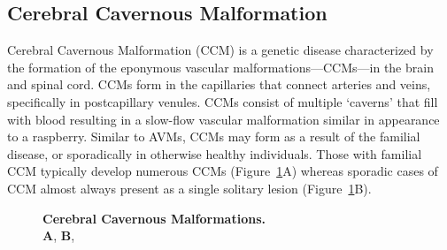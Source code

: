\subsection{Cerebral Cavernous Malformation}
Cerebral Cavernous Malformation (CCM) is a genetic disease characterized by the formation of the eponymous vascular malformations---CCMs---in the brain and spinal cord. CCMs form in the capillaries that connect arteries and veins, specifically in postcapillary venules. CCMs consist of multiple `caverns' that fill with blood resulting in a slow-flow vascular malformation similar in appearance to a raspberry. Similar to AVMs, CCMs may form as a result of the familial disease, or sporadically in otherwise healthy individuals. Those with familial CCM typically develop numerous CCMs (Figure~\ref{CCM_Lesion}A) whereas sporadic cases of CCM almost always present as a single solitary lesion (Figure~\ref{CCM_Lesion}B). 

\begin{figure}[tbp!]
\begin{center}
\end{center}
\caption[Cerebral Cavernous Malformations.] {\textbf{Cerebral Cavernous Malformations.} \\ \textbf{A},  \textbf{B}, }

\label{CCM_Lesion}
\end{figure}

